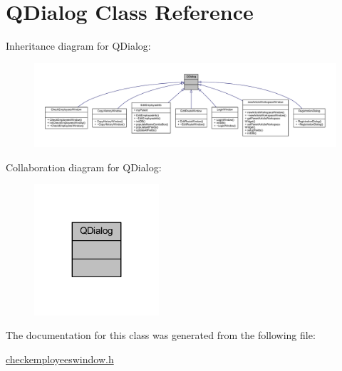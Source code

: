 \hypertarget{class_q_dialog}{}\section{Q\+Dialog Class Reference}
\label{class_q_dialog}


Inheritance diagram for Q\+Dialog\+:
\nopagebreak
\begin{figure}[H]
\begin{center}
\leavevmode
\includegraphics[width=350pt]{class_q_dialog__inherit__graph}
\end{center}
\end{figure}


Collaboration diagram for Q\+Dialog\+:
\nopagebreak
\begin{figure}[H]
\begin{center}
\leavevmode
\includegraphics[width=131pt]{class_q_dialog__coll__graph}
\end{center}
\end{figure}


The documentation for this class was generated from the following file\+:\begin{DoxyCompactItemize}
\item 
\hyperlink{checkemployeeswindow_8h}{checkemployeeswindow.\+h}\end{DoxyCompactItemize}
